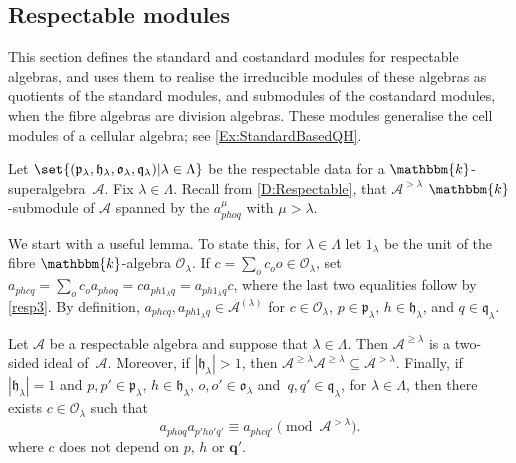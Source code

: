 \documentclass[a4paper,11pt]{amsart}
\numberwithin{equation}{subsection}
\theoremstyle{definition}
\theoremstyle{theorem}
\theoremstyle{remark}
\newcommand\CA{\mathcal{A}}
\newcommand\CO{\mathcal{O}}
\newcommand\plam[1][\lambda]{\mathfrak{p}_{#1}}
\newcommand\hlam[1][\lambda]{\mathfrak{h}_{#1}}
\newcommand\qlam[1][\lambda]{\mathfrak{q}_{#1}}
\newcommand\Olam[1][\lambda]{\CO_{#1}}
\newcommand\olam[1][\lambda]{\mathfrak{o}_{#1}}
\newcommand\kk{\mathbbm{k}}
\begin{document}
\subsection{Respectable modules}
This section defines the standard and costandard modules for respectable
algebras, and uses them to realise the irreducible modules of these
algebras as quotients of the standard modules, and submodules of the
costandard modules, when the fibre algebras are division algebras. These
modules generalise the cell modules of a cellular algebra; see
\autoref{Ex:StandardBasedQH}.

  Let $\set{(\plam,\hlam,\olam,\qlam)|\lambda\in\Lambda}$ be the
  respectable data for a $\kk$-superalgebra~$\CA$. Fix $\lambda\in\Lambda$.
Recall from \autoref{D:Respectable}, that $\CA^{>\lambda}$ $\kk$-submodule of $\CA$ spanned by the $a^\mu_{phoq}$ with $\mu>\lambda$.

We start with a useful lemma. To state this, for $\lambda\in\Lambda$ let
$1_\lambda$ be the unit of the fibre $\kk$-algebra $\Olam$. If
$c=\sum_oc_oo\in\Olam$, set $a_{phcq}=\sum_oc_oa_{phoq}=ca_{ph1_\lambda
q}=a_{ph1_\lambda q}c$, where the last two equalities follow by
\autoref{resp3}. By definition, $a_{phcq}, a_{ph1_\lambda q}\in
\CA^{(\lambda)}$ for $c\in\Olam$, $p\in\plam$, $h\in\hlam$, and
$q\in\qlam$.

 \begin{Lemma}\label{L:hlarge}
   Let $\CA$ be a respectable algebra and suppose that
   $\lambda\in\Lambda$. Then $\CA^{\ge\lambda}$ is a two-sided ideal
   of~$\CA$. Moreover, if $|\hlam|>1$, then
   $\CA^{\ge\lambda}\CA^{\ge\lambda}\subseteq\CA^{>\lambda}$.
   Finally, if $|\hlam|=1$ and
   $p,p'\in\plam$, $h\in\hlam$, $o,o'\in\olam$ and~$q,q'\in\qlam$,
   for $\lambda\in\Lambda$, then there exists $c\in\Olam$ such that
   \[
        a_{phoq}a_{p'ho'q'}\equiv a_{phcq'}\pmod{\CA^{>\lambda}}.
   \]
   where $c$ does not depend on $p$, $h$ or $\mathbf{q'}$.
\end{Lemma}
\end{document}
